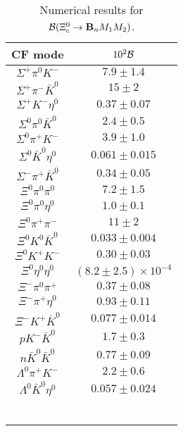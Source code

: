 \begin{table}
\centering
\caption{Numerical results for 
	${\cal B}(\Xi_{c}^{0} \to {\bf B}_nM_1M_2)$.}\label{pre_Xic0}
{\scriptsize
	\begin{tabular}{|c|c|}
		\hline
		CF mode& $10^{2}{\cal B}$\\
		\hline
		$ \Sigma^{+} \pi^{0} K^{-} $ & $     7.9 \pm     1.4 $ \\
		$\Sigma^{+} \pi^{-} \bar{K}^{0} $ & $    15 \pm     2 $ \\
		$\Sigma^{+} K^{-} \eta^{0}$ & $     0.37 \pm     0.07 $ \\
		$ \Sigma^{0} \pi^{0} \bar{K}^{0} $ & $     2.4 \pm     0.5 $ \\
		$ \Sigma^{0} \pi^{+} K^{-} $ & $     3.9 \pm     1.0 $ \\
		$\Sigma^{0} \bar{K}^{0} \eta^{0}$ & $     0.061 \pm     0.015 $ \\
		$\Sigma^{-} \pi^{+} \bar{K}^{0}$ & $     0.34 \pm     0.05 $ \\
		$ \Xi^{0} \pi^{0} \pi^{0} $ & $     7.2 \pm     1.5 $ \\
		$ \Xi^{0} \pi^{0} \eta^{0} $ & $     1.0 \pm     0.1 $ \\
		$\Xi^{0} \pi^{+} \pi^{-}$ & $    11 \pm     2 $ \\
		$\Xi^{0} K^{0} \bar{K}^{0}$ & $     0.033 \pm     0.004 $ \\
		$\Xi^{0} K^{+} K^{-} $ & $     0.30 \pm     0.03 $ \\
		$\Xi^{0} \eta^{0} \eta^{0} $ & $(8.2 \pm 2.5)\times 10^{-4} $ \\
		$\Xi^{-} \pi^{0} \pi^{+} $ & $     0.37 \pm     0.08 $ \\
		$\Xi^{-} \pi^{+} \eta^{0} $ & $     0.93 \pm     0.11 $ \\
		$\Xi^{-} K^{+} \bar{K}^{0} $ & $     0.077 \pm     0.014 $ \\
		$ p K^{-} \bar{K}^{0} $ & $     1.7 \pm     0.3 $ \\
		$n \bar{K}^{0} \bar{K}^{0} $ & $     0.77 \pm     0.09 $ \\
		$ \Lambda^{0} \pi^{+} K^{-} $ & $     2.2 \pm     0.6 $ \\
		$\Lambda^{0} \bar{K}^{0} \eta^{0} $ & $     0.057 \pm     0.024 $ \\
		&\\
		&\\
		&\\
		&\\
		&\\
		&\\

\end{tabular}}
\end{table}
